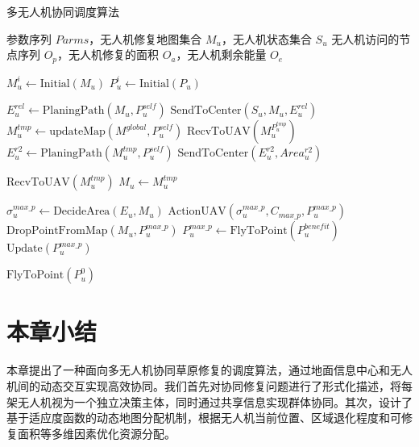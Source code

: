 \documentclass[AutoFakeBold]{LZUThesis}
\begin{document}
\begin{algorithm}[H]
	\caption{多无人机协同调度算法}
	\label{alg:multi_uav_scheduling}
	\begin{algorithmic}[1]
		\Require 参数序列 $Parms$，无人机修复地图集合 $M_u$，无人机状态集合 $S_u$
		\Ensure 无人机访问的节点序列 $O_p$，无人机修复的面积 $O_a$，无人机剩余能量 $O_e$

		\State $M_u^i \gets \text{Initial}(M_u)$ 
		\State $P_u^i \gets \text{Initial}(P_u)$ 

		\State $E_u^{rel} \gets \text{PlaningPath}(M_u, P_u^{self})$ 
		\State $\text{SendToCenter}(S_u, M_u, E_u^{rel})$ 
		\State $M_u^{tmp} \gets \text{updateMap}(M^{global}, P_u^{self})$ 
		\State $\text{RecvToUAV}(M_u^{P_u^{tmp}})$ 
		\State $E_u^{r2} \gets \text{PlaningPath}(M_u^{tmp}, P_u^{self})$ 
		\State $\text{SendToCenter}(E_u^{r2}, Area_u^{r2})$ 

		\State $\text{RecvToUAV}(M_u^{tmp})$ 
		\State $M_u \gets M_u^{tmp}$
		\EndIf

		\State $\sigma_u^{max\_p} \gets \text{DecideArea}(E_u, M_u)$ 
		\State $\text{ActionUAV}(\sigma_u^{max\_p}, C_{max\_p}, P_u^{max\_p})$ 
		\State $\text{DropPointFromMap}(M_u, P_u^{max\_p})$
		\State $P_u^{max\_p} \gets \text{FlyToPoint}(P_u^{benefit})$ 
		\State $\text{Update}(P_u^{max\_p})$ 
		\EndWhile

		\State $\text{FlyToPoint}(P_u^0)$ 
	\end{algorithmic}
\end{algorithm}
\section{本章小结}

本章提出了一种面向多无人机协同草原修复的调度算法，通过地面信息中心和无人机间的动态交互实现高效协同。我们首先对协同修复问题进行了形式化描述，将每架无人机视为一个独立决策主体，同时通过共享信息实现群体协同。其次，设计了基于适应度函数的动态地图分配机制，根据无人机当前位置、区域退化程度和可修复面积等多维因素优化资源分配。
\end{document}
